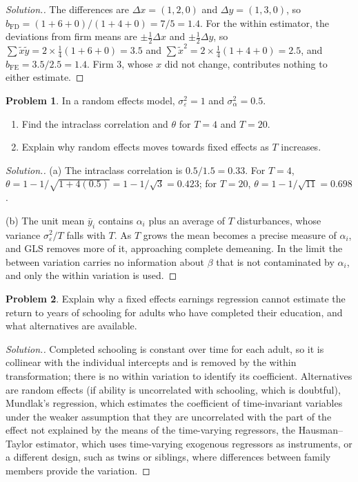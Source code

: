 \documentclass[11pt,a4paper]{article}
\numberwithin{equation}{section}
\theoremstyle{definition}
\newtheorem{problemx}{Problem}[subsection]
\newenvironment{problem}{\begin{problemx}}{\end{problemx}}
\newenvironment{solution}
  {\renewcommand{\qedsymbol}{}\begin{proof}[\textit{Solution}.]}
  {\end{proof}}
\begin{document}
\begin{solution}
The differences are $\Delta x = (1, 2, 0)$ and $\Delta y = (1, 3, 0)$, so $b_{\text{FD}} = (1 + 6 + 0)/(1 + 4 + 0) = 7/5 = 1.4$. For the within estimator, the deviations from firm means are
$\pm\frac12\Delta x$ and $\pm\frac12\Delta y$, so $\sum\tilde x\tilde y = 2 \times \frac14(1 + 6 + 0) = 3.5$ and $\sum\tilde x^2 = 2 \times \frac14(1 + 4 + 0) = 2.5$, and $b_{\text{FE}} = 3.5/2.5 = 1.4$. Firm 3, whose $x$ did not change,
contributes nothing to either estimate.
\end{solution}

\begin{problem}
In a random effects model, $\sigma_\varepsilon^2 = 1$ and $\sigma_\alpha^2 = 0.5$.
\begin{enumerate}[label=(\alph*)]
\item Find the intraclass correlation and $\theta$ for $T = 4$ and $T = 20$.
\item Explain why random effects moves towards fixed effects as $T$ increases.
\end{enumerate}
\end{problem}

\begin{solution}
(a) The intraclass correlation is $0.5/1.5 = 0.33$. For $T = 4$, $\theta = 1 - 1/\sqrt{1 + 4(0.5)} = 1 - 1/\sqrt3 = 0.423$; for $T = 20$, $\theta = 1 - 1/\sqrt{11} = 0.698$.

(b) The unit mean $\bar y_i$ contains $\alpha_i$ plus an average of $T$ disturbances, whose variance $\sigma_\varepsilon^2/T$ falls with $T$. As $T$ grows the mean becomes a precise measure of
$\alpha_i$, and GLS removes more of it, approaching complete demeaning. In the limit the between variation carries no information about $\beta$ that is not
contaminated by $\alpha_i$, and only the within variation is used.
\end{solution}

\begin{problem}
Explain why a fixed effects earnings regression cannot estimate the return to years of schooling for adults who have completed their education, and
what alternatives are available.
\end{problem}

\begin{solution}
Completed schooling is constant over time for each adult, so it is collinear with the individual intercepts and is removed by the within
transformation; there is no within variation to identify its coefficient. Alternatives are random effects (if ability is uncorrelated with
schooling, which is doubtful), Mundlak's regression, which estimates the coefficient of time-invariant variables under the weaker assumption that they
are uncorrelated with the part of the effect not explained by the means of the time-varying regressors, the Hausman--Taylor estimator, which uses
time-varying exogenous regressors as instruments, or a different design, such as twins or siblings, where differences between family members provide
the variation.
\end{solution}
\end{document}

